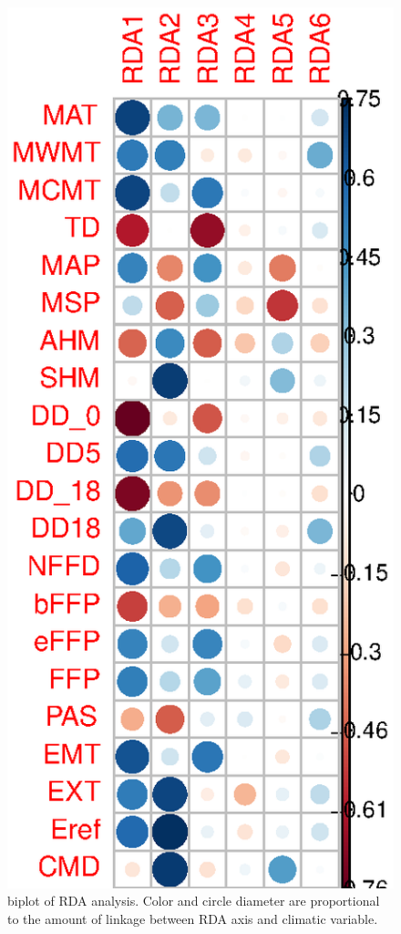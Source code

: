 \documentclass[12pt]{article}
\begin{document}
\begin{figure}[t]
\begin{center}
\includegraphics[height=0.6\textheight]{figures/corrplot.eps}
\end{center}
\caption{biplot of RDA analysis. Color and circle diameter are proportional to the amount of linkage between RDA axis and climatic variable.}%
\label{fig:corrplot}%
\end{figure}
\end{document}

